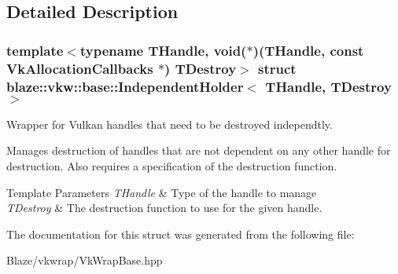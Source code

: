 \subsection{Detailed Description}
\subsubsection*{template$<$typename T\+Handle, void($\ast$)(\+T\+Handle, const Vk\+Allocation\+Callbacks $\ast$) T\+Destroy$>$\newline
struct blaze\+::vkw\+::base\+::\+Independent\+Holder$<$ T\+Handle, T\+Destroy $>$}

Wrapper for Vulkan handles that need to be destroyed independtly. 

Manages destruction of handles that are not dependent on any other handle for destruction. Also requires a specification of the destruction function.


\begin{DoxyTemplParams}{Template Parameters}
{\em T\+Handle} & Type of the handle to manage \\
\hline
{\em T\+Destroy} & The destruction function to use for the given handle. \\
\hline
\end{DoxyTemplParams}


The documentation for this struct was generated from the following file\+:\begin{DoxyCompactItemize}
\item 
Blaze/vkwrap/Vk\+Wrap\+Base.\+hpp\end{DoxyCompactItemize}
